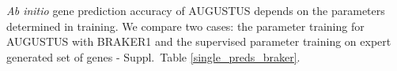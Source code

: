 \documentclass[a4paper,10pt]{report}
\begin{document}
\vspace{0.2cm}

% 

\textit{Ab initio} gene prediction accuracy of AUGUSTUS depends on the parameters determined in training. We compare two cases: the parameter training for AUGUSTUS with BRAKER1 and the supervised parameter training on expert generated set of genes - Suppl.~Table \ref{single_preds_braker}.
\end{document}
